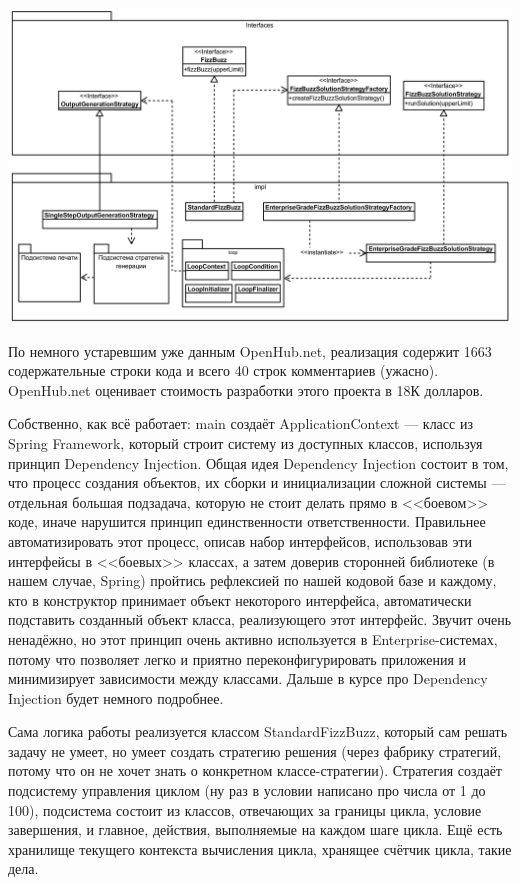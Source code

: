\documentclass{../../text-style}
\begin{document}
\begin{center}
    \includegraphics[width=\textwidth]{fizzBuzzArchitecture.png}
\end{center}

По немного устаревшим уже данным OpenHub.net, реализация содержит 1663 содержательные строки кода и всего 40 строк комментариев (ужасно). OpenHub.net оценивает стоимость разработки этого проекта в 18К долларов.

Собственно, как всё работает: main создаёт ApplicationContext --- класс из Spring Framework, который строит систему из доступных классов, используя принцип Dependency Injection. Общая идея Dependency Injection состоит в том, что процесс создания объектов, их сборки и инициализации сложной системы --- отдельная большая подзадача, которую не стоит делать прямо в <<боевом>> коде, иначе нарушится принцип единственности ответственности. Правильнее автоматизировать этот процесс, описав набор интерфейсов, использовав эти интерфейсы в <<боевых>> классах, а затем доверив сторонней библиотеке (в нашем случае, Spring) пройтись рефлексией по нашей кодовой базе и каждому, кто в конструктор принимает объект некоторого интерфейса, автоматически подставить созданный объект класса, реализующего этот интерфейс. Звучит очень ненадёжно, но этот принцип очень активно используется в Enterprise-системах, потому что позволяет легко и приятно переконфигурировать приложения и минимизирует зависимости между классами. Дальше в курсе про Dependency Injection будет немного подробнее.

Сама логика работы реализуется классом StandardFizzBuzz, который сам решать задачу не умеет, но умеет создать стратегию решения (через фабрику стратегий, потому что он не хочет знать о конкретном классе-стратегии). Стратегия создаёт подсистему управления циклом (ну раз в условии написано про числа от 1 до 100), подсистема состоит из классов, отвечающих за границы цикла, условие завершения, и главное, действия, выполняемые на каждом шаге цикла. Ещё есть хранилище текущего контекста вычисления цикла, хранящее счётчик цикла, такие дела.
\end{document}
